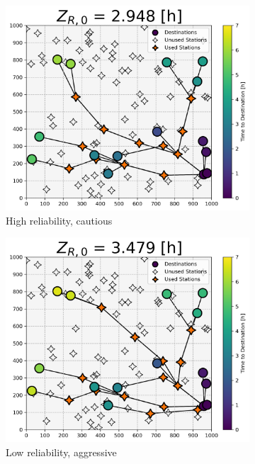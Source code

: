 \documentclass[11pt]{article}
\begin{document}
\begin{multicols}{2}
\begin{figure}[H]
\begin{subfigure}[t]{.5\linewidth}
		\includegraphics[width = \linewidth]{figs/random_example_high_reliability_cautious_actual.png}
		\caption{High reliability, cautious}
	\end{subfigure}
	\begin{subfigure}[t]{.5\linewidth}
		\centering\captionsetup{width = .8\linewidth}
		\includegraphics[width = \linewidth]{figs/random_example_low_reliability_aggressive_actual.png}
		\caption{Low reliability, aggressive}
	\end{subfigure}%
	\begin{subfigure}[t]{.5\linewidth}

\end{subfigure}
\end{figure}
\end{multicols}
\end{document}
